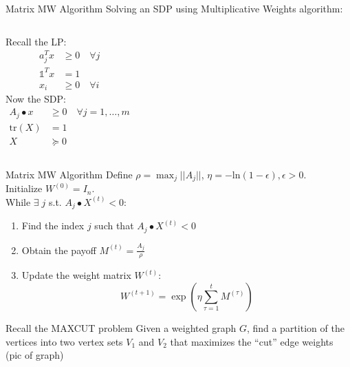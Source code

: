 \documentclass{beamer}
\begin{document}
\begin{frame}{Matrix MW Algorithm}
Solving an SDP using Multiplicative Weights algorithm: \\ \vspace{.5cm}
\begin{columns}[T]
Recall the LP: 
\begin{align*}
a_j^Tx &\geq 0 \quad \forall j \\
\mathds{1}^Tx &= 1 \\
x_i &\geq 0 \quad \forall i
\end{align*}
Now the SDP:
\begin{align*}
A_j \bullet x &\geq 0 \quad \forall j = 1,\ldots,m \\
\text{tr}(X) &= 1 \\
X & \succcurlyeq 0
\end{align*}
\end{columns}
\end{frame}


\begin{frame}{Matrix MW Algorithm}
Define $\rho = \max_j ||A_j||$, $\eta = -\text{ln}(1-\epsilon), \epsilon > 0$. \\ \vspace{.5cm}
Initialize $W^{(0)} = I_n$. \\ \vspace{.5cm}
While $\exists \; j$ s.t. $A_j \bullet X^{(t)} < 0$:
\begin{enumerate}
\setlength\itemsep{1.2em}
\item Find the index $j$ such that $A_j \bullet X^{(t)} < 0$
\item Obtain the payoff $M^{(t)} = \frac{A_j}{\rho}$
\item Update the weight matrix $W^{(t)}$:
$$ W^{(t+1)} = \exp \left(\eta \sum_{\tau =1}^t M^{(\tau)}\right)$$
\end{enumerate}
\end{frame}

\begin{frame}{Recall the MAXCUT problem}
Given a weighted graph $G$, find a partition of the vertices into two vertex sets $V_1$ and $V_2$ that maximizes the ``cut'' edge weights\\
\vspace{2cm}
(pic of graph)
\end{frame}
\end{document}
